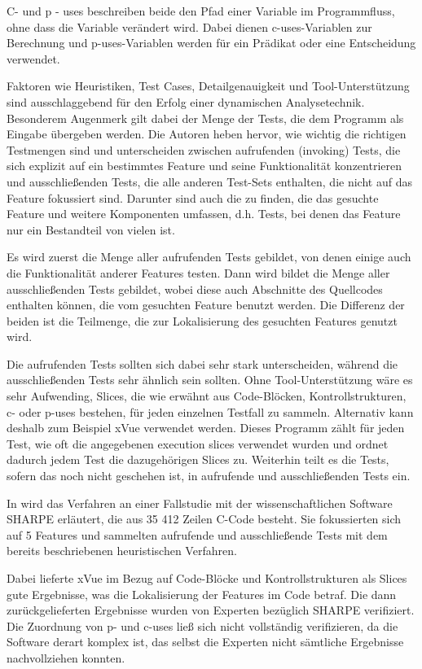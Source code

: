 \documentclass[runningheads,a4paper]{llncs}
\begin{document}
C- und p - uses beschreiben beide den Pfad einer Variable im Programmfluss, ohne dass die Variable verändert wird. Dabei dienen c-uses-Variablen zur Berechnung und p-uses-Variablen werden für ein Prädikat oder eine Entscheidung verwendet.

Faktoren wie Heuristiken, Test Cases, Detailgenauigkeit und Tool-Unterstützung sind ausschlaggebend für den Erfolg einer dynamischen Analysetechnik. Besonderem Augenmerk gilt dabei der Menge der Tests, die dem Programm als Eingabe übergeben werden. Die Autoren heben hervor, wie wichtig die richtigen Testmengen sind und unterscheiden zwischen aufrufenden (invoking) Tests, die sich explizit auf ein bestimmtes Feature und seine Funktionalität konzentrieren und ausschließenden Tests, die alle anderen Test-Sets enthalten, die nicht auf das Feature fokussiert sind. Darunter sind auch die zu finden, die das gesuchte Feature und weitere Komponenten umfassen, d.h. Tests, bei denen das Feature nur ein Bestandteil von vielen ist.

Es wird zuerst die Menge aller aufrufenden Tests gebildet, von denen einige auch die Funktionalität anderer Features testen. Dann wird bildet die Menge aller ausschließenden Tests gebildet, wobei diese auch Abschnitte des Quellcodes enthalten können, die vom gesuchten Feature benutzt werden. Die Differenz der beiden ist die Teilmenge, die zur Lokalisierung des gesuchten Features genutzt wird.

Die aufrufenden Tests sollten sich dabei sehr stark unterscheiden, während die ausschließenden Tests sehr ähnlich sein sollten. Ohne Tool-Unterstützung wäre es sehr Aufwending, Slices, die wie erwähnt aus Code-Blöcken, Kontrollstrukturen, c- oder p-uses bestehen, für jeden einzelnen Testfall zu sammeln. Alternativ kann deshalb zum Beispiel xVue verwendet werden. Dieses Programm zählt für jeden Test, wie oft die angegebenen execution slices verwendet wurden und ordnet dadurch jedem Test die dazugehörigen Slices zu. Weiterhin teilt es die Tests, sofern das noch nicht geschehen ist, in aufrufende und ausschließenden Tests ein.

In \cite{Executionslices} wird das Verfahren an einer Fallstudie mit der wissenschaftlichen Software SHARPE erläutert, die aus 35 412 Zeilen C-Code besteht. Sie fokussierten sich auf 5 Features und sammelten aufrufende und ausschließende Tests mit dem bereits beschriebenen heuristischen Verfahren.

Dabei lieferte xVue im Bezug auf Code-Blöcke und Kontrollstrukturen als Slices gute Ergebnisse, was die Lokalisierung der Features im Code betraf. Die dann zurückgelieferten Ergebnisse wurden von Experten bezüglich SHARPE verifiziert. Die Zuordnung von p- und c-uses ließ sich nicht vollständig verifizieren, da die Software derart komplex ist, das selbst die Experten nicht sämtliche Ergebnisse nachvollziehen konnten.
\end{document}
